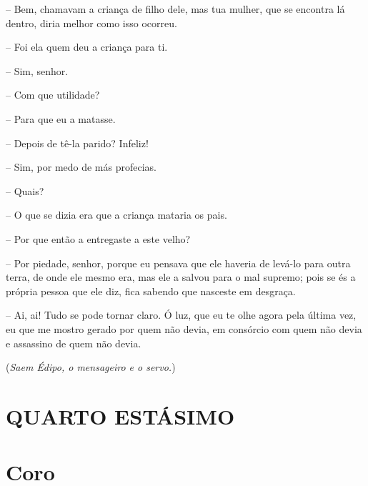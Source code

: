  --   Bem, chamavam a criança de filho dele, mas tua mulher, que se encontra
lá dentro, diria melhor como isso ocorreu.

 --   Foi ela quem deu a criança para ti.

 --   Sim, senhor.

 --   Com que utilidade?

 --   Para que eu a matasse.

 --   Depois de tê-la parido? Infeliz!

 --   Sim, por medo de más profecias.

 --   Quais?

 --   O que se dizia era que a criança mataria os pais.

 --   Por que então a entregaste a este velho?

 --   Por piedade, senhor, porque eu pensava que ele haveria de levá-lo para
outra  terra, de onde ele mesmo era, mas ele a salvou para o mal
supremo; pois se és a própria pessoa que ele diz, fica sabendo que
nasceste em desgraça.

 --   Ai, ai! Tudo se pode tornar claro. Ó luz, que eu te olhe agora pela
última vez, eu que me mostro gerado por quem não devia, em consórcio com
quem não devia e assassino de quem não devia.

(\emph{Saem Édipo, o mensageiro e o servo.})

\section{QUARTO ESTÁSIMO}


\section{Coro} 

